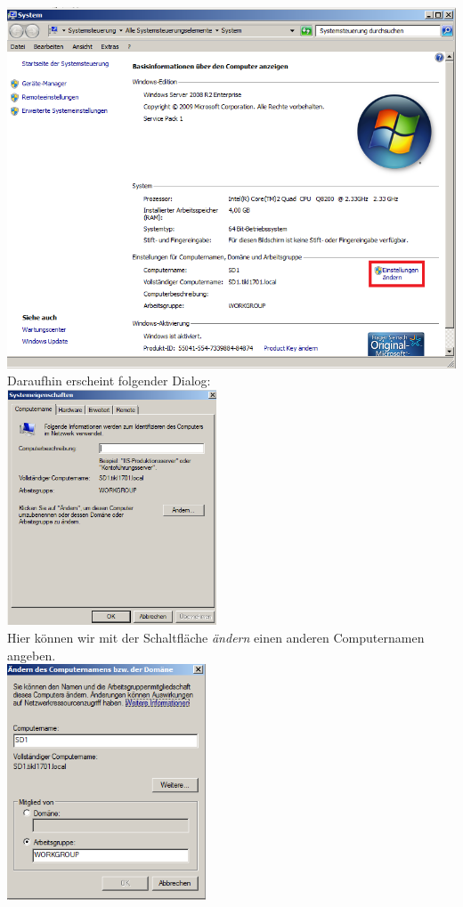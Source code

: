 \documentclass[12pt,a4paper,titlepage]{scrartcl} %
\begin{document}
	\includegraphics[width=14cm]{Bilder/001(Kasten)}\\

\newpage
Daraufhin erscheint folgender Dialog:\\

	\includegraphics[height=7cm]{Bilder/002}\\
		
Hier können wir mit der Schaltfläche \emph{ändern} einen anderen Computernamen angeben.\\

	\includegraphics[height=7cm]{Bilder/003}\\
		
\end{document}
